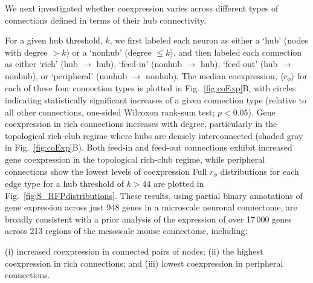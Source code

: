 \documentclass[10pt,letterpaper]{article}
\begin{document}
We next investigated whether coexpression varies across different types of connections defined in terms of their hub connectivity.

For a given hub threshold, $k$, we first labeled each neuron as either a `hub' (nodes with degree $> k$) or a `nonhub' (degree $\leq k$), and then labeled each connection as either `rich' (hub $\rightarrow$ hub), `feed-in' (nonhub $\rightarrow$ hub), `feed-out' (hub $\rightarrow$ nonhub), or `peripheral' (nonhub $\rightarrow$ nonhub).
The median coexpression, $\langle r_\phi \rangle$ for each of these four connection types is plotted in Fig.~\ref{fig:coExp}B, with circles indicating statistically significant increases of a given connection type (relative to all other connections, one-sided Wilcoxon rank-sum test;  $p<0.05$).
Gene coexpression in rich connections increases with degree, particularly in the topological rich-club regime where hubs are densely interconnected (shaded gray in Fig.~\ref{fig:coExp}B).
Both feed-in and feed-out connections exhibit increased gene coexpression in the topological rich-club regime, while peripheral connections show the lowest levels of coexpression
Full $r_\phi$ distributions for each edge type for a hub threshold of $k > 44$ are plotted in Fig.~\ref{fig:S_RFPdistributions}.
These results, using partial binary annotations of gene expression across just 948 genes in a microscale neuronal connectome, are broadly consistent with a prior analysis of the expression of over 17\,000 genes across 213 regions of the mesoscale mouse connectome, including:

(i) increased coexpression in connected pairs of nodes;
(ii) the highest coexpression in rich connections; and
(iii) lowest coexpression in peripheral connections.
\end{document}
